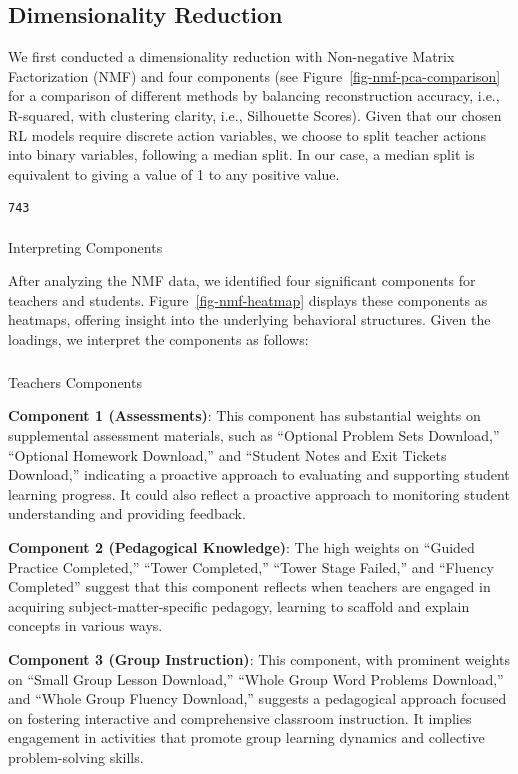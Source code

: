 \documentclass[
  number,
  preprint,
  3p,
  onecolumn]{elsarticle}
\makeatletter
\let\oldparagraph\paragraph
\renewcommand{\paragraph}{
    \@ifstar
      \xxxParagraphStar
      \xxxParagraphNoStar
  }
\newcommand{\xxxParagraphStar}[1]{\oldparagraph*{#1}\mbox{}}
\newcommand{\xxxParagraphNoStar}[1]{\oldparagraph{#1}\mbox{}}
\let\oldsubparagraph\subparagraph
\renewcommand{\subparagraph}{
    \@ifstar
      \xxxSubParagraphStar
      \xxxSubParagraphNoStar
  }
\newcommand{\xxxSubParagraphStar}[1]{\oldsubparagraph*{#1}\mbox{}}
\newcommand{\xxxSubParagraphNoStar}[1]{\oldsubparagraph{#1}\mbox{}}
\makeatother
\begin{document}
\subsection{Dimensionality Reduction}\label{dimensionality-reduction}

We first conducted a dimensionality reduction with Non-negative Matrix
Factorization (NMF) and four components (see
Figure~\ref{fig-nmf-pca-comparison} for a comparison of different
methods by balancing reconstruction accuracy, i.e., R-squared, with
clustering clarity, i.e., Silhouette Scores). Given that our chosen RL
models require discrete action variables, we choose to split teacher
actions into binary variables, following a median split. In our case, a
median split is equivalent to giving a value of 1 to any positive value.

\begin{verbatim}
743
\end{verbatim}

\paragraph{Interpreting Components}\label{interpreting-components}

After analyzing the NMF data, we identified four significant components
for teachers and students. Figure~\ref{fig-nmf-heatmap} displays these
components as heatmaps, offering insight into the underlying behavioral
structures. Given the loadings, we interpret the components as follows:

\subparagraph{Teachers Components}\label{teachers-components}

\textbf{Component 1 (Assessments)}: This component has substantial
weights on supplemental assessment materials, such as ``Optional Problem
Sets Download,'' ``Optional Homework Download,'' and ``Student Notes and
Exit Tickets Download,'' indicating a proactive approach to evaluating
and supporting student learning progress. It could also reflect a
proactive approach to monitoring student understanding and providing
feedback.

\textbf{Component 2 (Pedagogical Knowledge)}: The high weights on
``Guided Practice Completed,'' ``Tower Completed,'' ``Tower Stage
Failed,'' and ``Fluency Completed'' suggest that this component reflects
when teachers are engaged in acquiring subject-matter-specific pedagogy,
learning to scaffold and explain concepts in various ways.

\textbf{Component 3 (Group Instruction)}: This component, with prominent
weights on ``Small Group Lesson Download,'' ``Whole Group Word Problems
Download,'' and ``Whole Group Fluency Download,'' suggests a pedagogical
approach focused on fostering interactive and comprehensive classroom
instruction. It implies engagement in activities that promote group
learning dynamics and collective problem-solving skills.
\end{document}
